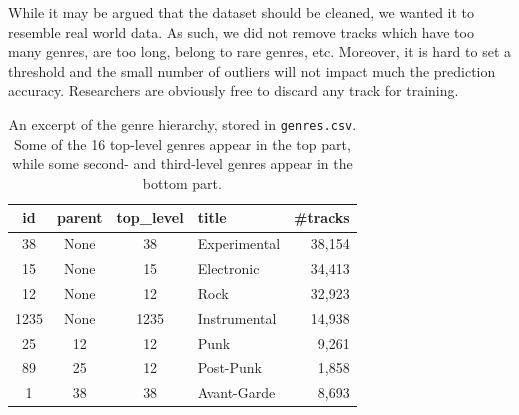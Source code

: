 \documentclass{article}
\begin{document}
While it may be argued that the dataset should be cleaned, we wanted it to resemble real world data. As such, we did not remove tracks which have too many genres, are too long, belong to rare genres, etc. Moreover, it is hard to set a threshold and the small number of outliers will not impact much the prediction accuracy. Researchers are obviously free to discard any track for training.



\begin{table}
	\small
	\centering
	\begin{tabular}{ccclr}
		\toprule
		id & parent & top\_level & title & \#tracks \\
		\midrule
		38 & None & 38 & Experimental & 38,154 \\
		15 & None & 15 & Electronic & 34,413 \\
		12 & None & 12 & Rock & 32,923 \\
		1235 & None & 1235 & Instrumental & 14,938 \\
		\midrule
		25 & 12 & 12 & Punk & 9,261 \\
		89 & 25 & 12 & Post-Punk & 1,858 \\
		1  & 38 & 38 & Avant-Garde & 8,693 \\
		\bottomrule
	\end{tabular}
	\caption{An excerpt of the genre hierarchy, stored in \texttt{genres.csv}. Some of the 16 top-level genres appear in the top part, while some second- and third-level genres appear in the bottom part.}
	\label{tab:genres}
\end{table}
\end{document}
